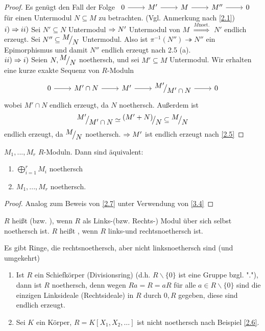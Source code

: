 \begin{proof}
	Es genügt den Fall der Folge $\begin{tikzcd}
	0  \arrow{r} & M' \arrow{r} & M \arrow{r} & M'' \arrow{r} & 0
	\end{tikzcd} $  für einen Untermodul $N \subseteq M $ zu betrachten. (Vgl. Anmerkung nach \ref{2.1})\\
	$i) \Rightarrow ii)$ Sei $N' \subseteq N $ Untermodul $\Rightarrow N' $ Untermodul von $M$ $\overset{M \text{noet.}}{\Longrightarrow} $ $N' $ endlich erzeugt. Sei $N'' \subseteq \QR{M}{N}$ Untermodul. Also ist $\pi^{-1}(N'') \twoheadrightarrow N''$ ein Epimorphismus und damit $ N'' $ endlich erzeugt nach 2.5 (a). \\
	$ii) \Rightarrow i)$ Seien $N, \QR{M}{N}$ noethersch, und sei $M' \subseteq M $ Untermodul. Wir erhalten eine kurze exakte Sequenz von $R$-Moduln  $$\begin{tikzcd}
	0  \arrow{r} & M' \cap N \arrow{r}{} & M' \arrow{r}{} & \QR{M'}{M' \cap N} \arrow{r} & 0
	\end{tikzcd} $$wobei $M' \cap N $ endlich erzeugt, da $N$ noethersch. Außerdem ist $$\QR{M'}{M' \cap N} \simeq \QR{(M'+N)}{N} \subseteq \QR{M}{N} $$ endlich erzeugt, da $\QR{M}{N} $ noethersch. $\Rightarrow M' $ ist endlich erzeugt nach \ref{2.5}
\end{proof}
\begin{bem}\label{3.5}
	$M_1,...,M_r$ $R$-Moduln. Dann sind äquivalent: 
	\begin{enumerate} [label= \roman*)]
		\item $\bigoplus_{i=1}^r M_i $ noethersch 
		\item $M_1,...,M_r $ noethersch.
	\end{enumerate}
\end{bem}
\begin{proof}
	Analog zum Beweis von \ref{2.7} unter Verwendung von \ref{3.4}
\end{proof}
\begin{df}\label{3.6}
	$R$ heißt  (bzw. ), wenn $R$ als Links-(bzw. Rechts-) Modul über sich selbst noethersch ist. $R$ heißt , wenn $R$ links-und rechtsnoethersch ist.
\end{df}
\begin{anm}
	Es gibt Ringe, die rechtsnoethersch, aber nicht linksnoethersch sind (und umgekehrt)
\end{anm}
\begin{bsp}
	\begin{enumerate} [label=\alph*)]
		\item Ist $R$ ein Schiefkörper (Divisionsring) (d.h. $R \backslash \{0\}$ ist eine Gruppe bzgl. "."), dann ist $R$ noethersch, denn wegen $Ra=R=aR$ für alle $ a \in R \backslash \{0\}$ sind die einzigen Linksideale (Rechtsideale) in $R$ durch $0,R$ gegeben, diese sind endlich erzeugt.
		\item Sei $K$ ein Körper, $ R= K [ X_1,X_2,\dots ]$ ist nicht noethersch nach Beispiel \ref{2.6}.
	\end{enumerate}
\end{bsp}
